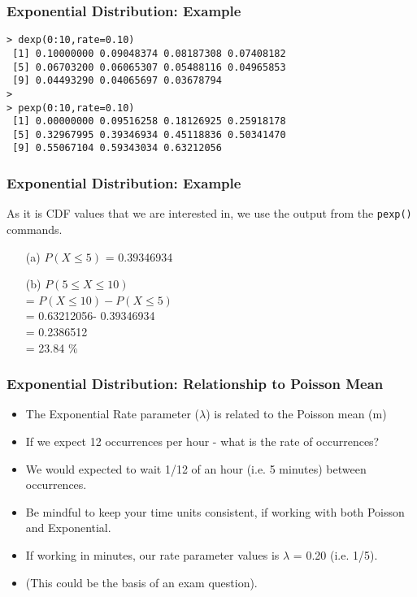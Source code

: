 \documentclass[a4]{beamer}
\begin{document}
\begin{frame}[fragile]
\frametitle{Exponential Distribution: Example}
\begin{verbatim}
> dexp(0:10,rate=0.10)
 [1] 0.10000000 0.09048374 0.08187308 0.07408182 
 [5] 0.06703200 0.06065307 0.05488116 0.04965853 
 [9] 0.04493290 0.04065697 0.03678794
>
> pexp(0:10,rate=0.10)
 [1] 0.00000000 0.09516258 0.18126925 0.25918178 
 [5] 0.32967995 0.39346934 0.45118836 0.50341470 
 [9] 0.55067104 0.59343034 0.63212056
\end{verbatim}
\end{frame}

\begin{frame}[fragile]
\frametitle{Exponential Distribution: Example}

As it is CDF values that we are interested in, we use the output from the \texttt{pexp()} commands.

\begin{itemize}
\item[(a)] $P(X \leq 5)$ = 0.39346934
\item[(b)] $P(5 \leq X \leq 10)$ \\ = $P( X \leq 10) - P( X \leq 5)$ \\ = 0.63212056- 0.39346934 \\ = 0.2386512 \\= 23.84 $\%$
\end{itemize}

\end{frame}



\begin{frame}[fragile]
\frametitle{Exponential Distribution: Relationship to Poisson Mean}
\begin{itemize}
\item The Exponential Rate parameter ($\lambda$) is related to the Poisson mean (m)
\item If we expect 12 occurrences per hour - what is the rate of occurrences?
\item We would expected to wait 1/12 of an hour (i.e. 5 minutes) between occurrences.
\item Be mindful to keep your time units consistent, if working with both Poisson and Exponential.
\item If working in minutes, our rate parameter values is $\lambda$ = 0.20 (i.e. 1/5).
\item (This could be the basis of an exam question).
\end{itemize}
\end{frame}
\end{document}
